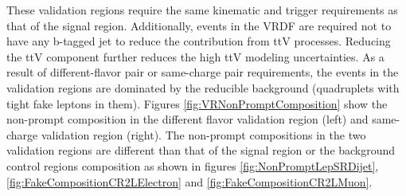 These validation regions require the same kinematic and trigger requirements as that of the signal region. Additionally, events in the VRDF are required not to have any b-tagged jet to reduce the contribution from ttV processes. Reducing the ttV component further reduces the high ttV modeling uncertainties. As a result of different-flavor pair or same-charge pair requirements, the events in the validation regions are dominated by the reducible background (quadruplets with tight fake leptons in them). Figures \ref{fig:VRNonPromptComposition} show the non-prompt composition in the different flavor validation region (left) and same-charge validation region (right). The non-prompt compositions in the two validation regions are different than that of the signal region or the background control regions composition as shown in figures \ref{fig:NonPromptLepSRDijet}, \ref{fig:FakeCompositionCR2LElectron} and \ref{fig:FakeCompositionCR2LMuon}.

